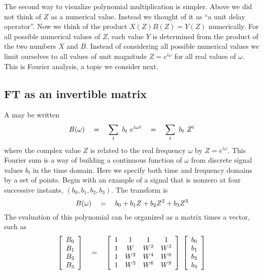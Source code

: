 \par
The second way to visualize polynomial multiplication is simpler.
Above we did not think of $Z$ as a numerical value.
Instead we thought of it as ``a unit delay operator''.
Now we think of the product $X(Z) B(Z) = Y(Z)$ numerically.
For all possible numerical values of $Z$,
each value $Y$ is determined
from the product of the two numbers $X$ and $B$.
Instead of considering all possible numerical values
we limit ourselves to all values of unit magnitude
$Z=e^{i\omega}$ for all real values of $\omega$.
This is Fourier analysis, a topic we consider next.

\subsection{FT as an invertible matrix}
\par
A  may be written
\begin{equation}
B(\omega) \eq  \sum_t \ b_t \ e^{i\omega t}
	  \eq  \sum_t \ b_t \ Z^t
\end{equation}
where the complex value $Z$
is related to the real frequency
$\omega$ by $Z=e^{i\omega}$.
This Fourier sum is a way of building
a continuous function of $\omega$
from discrete signal values $b_t$ in the time domain.
Here we specify both time and frequency domains by a set of points.
Begin with an example of a signal
that is nonzero at four successive instants,
$( b_0, b_1, b_2, b_3)$.
The transform is
\begin{equation}
B(\omega) \quad =\quad  b_0 + b_1 Z + b_2 Z^2 + b_3 Z^3
\end{equation}
The evaluation of this polynomial can be organized as a matrix times a vector,
such as
\begin{equation}
  \left[ \begin{array}{c}
   B_0 \\
   B_1 \\
   B_2 \\
   B_3  \end{array} \right]
\quad =\quad   \left[ \begin{array}{cccc}
   1 & 1 & 1 & 1 \\
   1 & W & W^2 & W^3 \\
   1  & W^2 & W^4 & W^6 \\
   1  & W^3 & W^6 & W^9  \end{array} \right]  \;
  \left[ \begin{array}{c}
   b_0 \\
   b_1 \\
   b_2 \\
   b_3  \end{array} \right]   
\label{eqn:3-3}
\end{equation}
